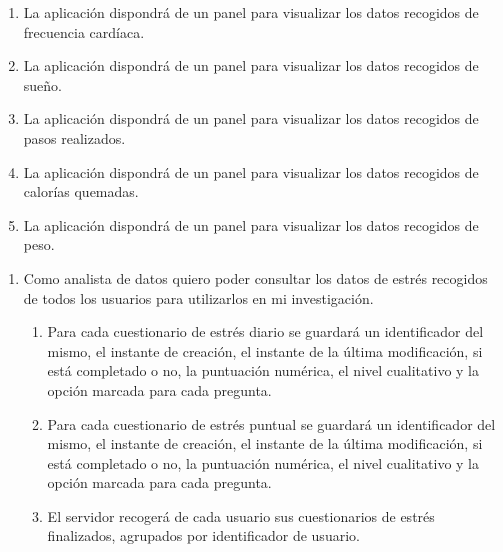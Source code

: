 \begin{enumerate}[resume=req-usuario,label=\textbf{\texttt{RU-\arabic*}}]
\begin{enumerate}[resume=req-funcionales,label=\textbf{\texttt{RF-\arabic*}}]
                \item \label{req:funcionales:visualizar_frecuencia} La aplicación dispondrá de un panel para visualizar los datos recogidos de frecuencia cardíaca.
                \item \label{req:funcionales:visualizar_sueno} La aplicación dispondrá de un panel para visualizar los datos recogidos de sueño.
                \item \label{req:funcionales:visualizar_pasos} La aplicación dispondrá de un panel para visualizar los datos recogidos de pasos realizados.
                \item \label{req:funcionales:visualizar_calorias} La aplicación dispondrá de un panel para visualizar los datos recogidos de calorías quemadas.
                \item \label{req:funcionales:visualizar_peso} La aplicación dispondrá de un panel para visualizar los datos recogidos de peso.
            \end{enumerate}
        \end{enumerate}
        \begin{enumerate}[resume=req-usuario,label=\textbf{\texttt{RU-\arabic*}}]
            \item \label{req:usuario:analista_estres} Como analista de datos quiero poder consultar los datos de estrés recogidos de todos los usuarios para utilizarlos en mi investigación.
            \begin{enumerate}[resume=req-funcionales,label=\textbf{\texttt{RF-\arabic*}}]
                 \item \label{req:funcionales:estres_diario_formato} Para cada cuestionario de estrés diario se guardará un identificador del mismo, el instante de creación, el instante de la última modificación, si está completado o no, la puntuación numérica, el nivel cualitativo y la opción marcada para cada pregunta.
                \item \label{req:funcionales:estres_puntual_formato} Para cada cuestionario de estrés puntual se guardará un identificador del mismo, el instante de creación, el instante de la última modificación, si está completado o no, la puntuación numérica, el nivel cualitativo y la opción marcada para cada pregunta.
                \item \label{req:funcionales:estres_finalizado_servidor} El servidor recogerá de cada usuario sus cuestionarios de estrés finalizados, agrupados por identificador de usuario.
            \end{enumerate}
        \end{enumerate}
